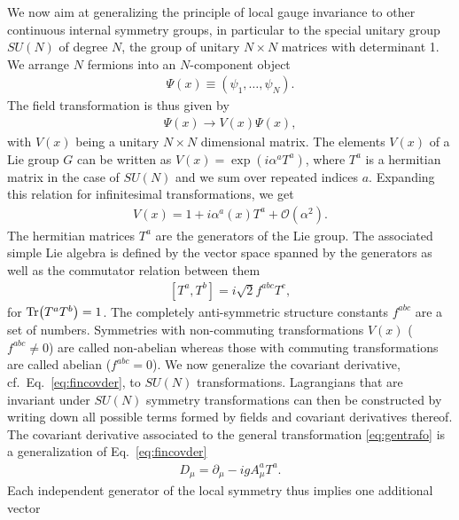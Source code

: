 We now aim at generalizing the principle of local gauge invariance
to other continuous internal symmetry groups, in particular to the special
unitary group $SU(N)$ of degree $N$, the group of unitary $N\times N$
matrices with determinant 1. We arrange $N$ fermions into an
$N$-component object 
\begin{align}
  \Psi(x) \equiv (\psi_1,\dots,\psi_N).
\end{align}
The field transformation is thus
given by 
\begin{align}\label{eq:gentrafo}
  \Psi(x) \rightarrow V(x)\Psi(x),
\end{align}
with $V(x)$ being a unitary $N\times N$ dimensional matrix. The
elements $V(x)$
of a Lie group $G$ can be written as $V(x)=\exp(i\alpha^a
  T^a)$, where $T^a$ is a hermitian matrix in the case of $SU(N)$ and we sum over repeated
  indices $a$. Expanding this relation for infinitesimal transformations, we get
\begin{align}
  V(x) = 1 +i\alpha^a(x) T^a +\mathcal{O}(\alpha^2).
\end{align}
The hermitian matrices $T^a$ are the generators of the Lie group. The
associated simple Lie
algebra is defined by the vector space spanned by the generators
as well as the commutator relation between them
\begin{align}\label{eq:commgen}
  [T^a,T^b] = i\sqrt{2}f^{abc}T^c,
\end{align}
for $\Tr(T^aT^b)=1$. The completely anti-symmetric structure constants $f^{abc}$ are a set
of numbers. Symmetries with non-commuting transformations
$V(x)$ ($f^{abc}\neq 0$) are called non-abelian whereas those with commuting
transformations are called abelian ($f^{abc}=0$). We now generalize the covariant derivative, cf.~Eq.~\ref{eq:fincovder},
to $SU(N)$ transformations. Lagrangians that are invariant under $SU(N)$ symmetry
transformations can then be constructed by writing down all possible
terms formed by fields and covariant derivatives thereof. The covariant
derivative associated to the general transformation
\eqref{eq:gentrafo} is a generalization of
Eq.~\eqref{eq:fincovder}
\begin{align}\label{eq:covderym}
  D_\mu = \partial_\mu - i g A^a_\mu T^a.
\end{align}
Each independent generator of the local symmetry thus implies one additional vector
